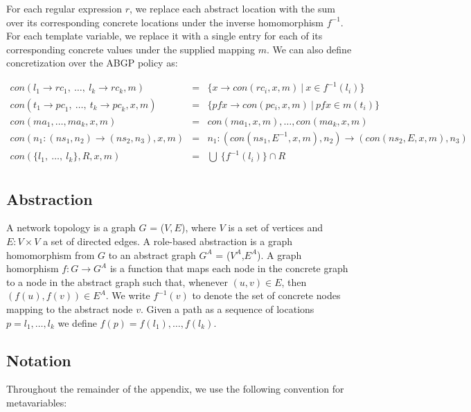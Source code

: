 \documentclass[twocolumn]{sig-alternate-10pt}
\begin{document}
For each regular expression $r$, we replace each abstract location with the sum over its corresponding concrete locations under the inverse homomorphism $f^{-1}$. For each template variable, we replace it with a single entry for each of its corresponding concrete values under the supplied mapping $m$.
We can also define concretization over the ABGP policy as:

\[ \begin{array}{rcl}
     con(l_1 \rightarrow {rc}_1, ~\dots,~ l_k \rightarrow {rc}_k,m) 
        & = & 
        \{ x \rightarrow con(rc_i,x,m)  ~\vert~ x \in f^{-1}(l_i) \}
        \\
     con(t_1 \rightarrow {pc}_1, ~\dots,~ t_k \rightarrow {pc}_k,x,m) 
        & = &  
        \{ pfx \rightarrow con(pc_i,x,m) ~\vert~ pfx \in m(t_i) \}
        \\
     con(ma_1, \dots, ma_k,x,m) 
        & = &
        con(ma_1,x,m), \dots, con(ma_k,x,m)
        \\
     con(n_1 : ({ns}_1, n_2) \rightarrow ({ns}_2, n_3),x,m) 
        & = & 
        n_1 : ( con({ns}_1,E^{-1},x,m), n_2) \rightarrow (con({ns}_2,E,x,m),n_3)
        \\
     con(\{ l_1, ~\dots,~ l_k \}, R, x, m) 
        & = &  
        \bigcup ~ \{ f^{-1}(l_i) \} \cap R
        \\
\end{array} \]

\subsection{Abstraction}

A network topology is a graph $G$ = ($V, E$), where $V$ is a set of vertices and $E \colon V \times V$ a set of directed edges. A role-based abstraction is a graph homomorphism from $G$ to an abstract graph $G^A$ = ($V^A$,$E^A$). A graph homorphism $f : G \rightarrow G^A$ is a function that maps each node in the concrete graph to a node in the abstract graph such that, whenever $(u,v) \in E$, then $(f(u),f(v)) \in E^A$. We write $f^{-1}(v)$ to denote the set of concrete nodes mapping to the abstract node $v$. Given a path as a sequence of locations $p = l_1, \dots, l_k$ we define $f(p) = f(l_1), \dots, f(l_k)$.


\subsection{Notation}

Throughout the remainder of the appendix, we use the following convention for metavariables:
\end{document}
